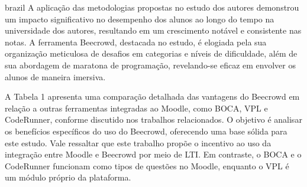 \begin{otherlanguage*}{brazil}
A aplicação das metodologias propostas no estudo dos autores demonstrou um impacto significativo no desempenho dos alunos ao longo do tempo na universidade dos autores, resultando em um crescimento notável e consistente nas notas. A ferramenta Beecrowd, destacada no estudo, é elogiada pela sua organização meticulosa de desafios em categorias e níveis de dificuldade, além de sua abordagem de maratona de programação, revelando-se eficaz em envolver os alunos de maneira imersiva.

A Tabela 1 apresenta uma comparação detalhada das vantagens do Beecrowd em relação a outras ferramentas integradas ao Moodle, como BOCA, VPL e CodeRunner, conforme discutido nos trabalhos relacionados. O objetivo é analisar os benefícios específicos do uso do Beecrowd, oferecendo uma base sólida para este estudo. Vale ressaltar que este trabalho propõe o incentivo ao uso da integração entre Moodle e Beecrowd por meio de LTI. Em contraste, o BOCA e o CodeRunner funcionam como tipos de questões no Moodle, enquanto o VPL é um módulo próprio da plataforma.


\end{otherlanguage*}
